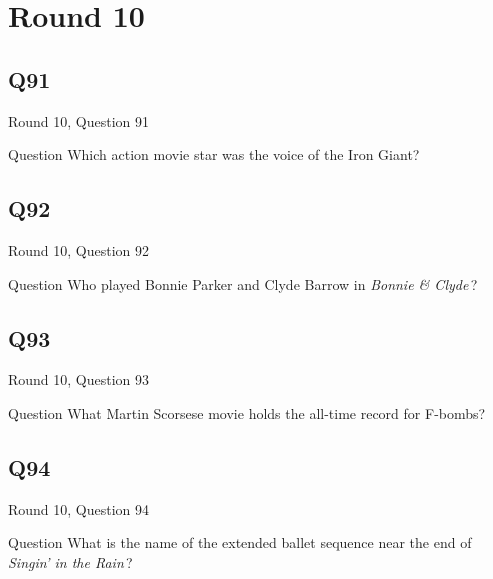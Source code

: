 \documentclass[11pt]{beamer}
\begin{document}
\section{Round 10}
    

\subsection*{Q91}
\begin{frame}[t]{Round 10, Question 91}
\vspace{2em}
\begin{block}{Question}
Which action movie star was the voice of the Iron Giant?
\end{block}
\end{frame}
    

\subsection*{Q92}
\begin{frame}[t]{Round 10, Question 92}
\vspace{2em}
\begin{block}{Question}
Who played Bonnie Parker and Clyde Barrow in \emph{Bonnie \& Clyde}\,?
\end{block}
\end{frame}
    

\subsection*{Q93}
\begin{frame}[t]{Round 10, Question 93}
\vspace{2em}
\begin{block}{Question}
What Martin Scorsese movie holds the all-time record for F-bombs?
\end{block}
\end{frame}
    

\subsection*{Q94}
\begin{frame}[t]{Round 10, Question 94}
\vspace{2em}
\begin{block}{Question}
What is the name of the extended ballet sequence near the end of \emph{Singin' in the Rain}\,?
\end{block}
\end{frame}
    
\end{document}
